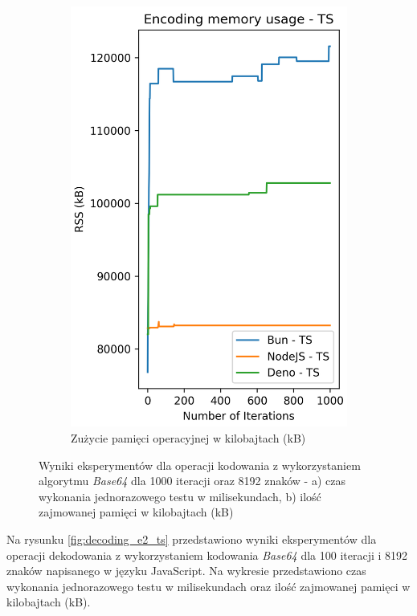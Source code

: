 \begin{figure}[H]
\begin{subfigure}[b]{0.4\textwidth}
    \includegraphics[width=\textwidth]{Figures/coding/base64_1000_encoding_ts_memory.png}
    \caption{Zużycie pamięci operacyjnej w kilobajtach (kB)}
    \label{fig:encoding_e2_ts_memory}
  \end{subfigure}
  \hfill
  \caption{Wyniki eksperymentów dla operacji kodowania z wykorzystaniem algorytmu \textit{Base64} dla 1000 iteracji oraz 8192 znaków - a) czas wykonania jednorazowego testu w milisekundach, b) ilość zajmowanej pamięci w kilobajtach (kB)}
  \label{fig:encoding_e2_ts}
\end{figure}

Na rysunku \ref{fig:decoding_e2_ts} przedstawiono wyniki eksperymentów dla operacji dekodowania z wykorzystaniem kodowania \textit{Base64} dla 100 iteracji i 8192 znaków napisanego w języku JavaScript. Na wykresie przedstawiono czas wykonania jednorazowego testu w milisekundach oraz ilość zajmowanej pamięci w kilobajtach (kB).

